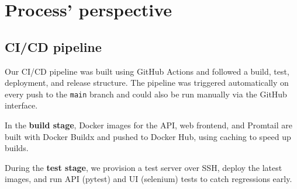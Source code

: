 \section{Process' perspective}
\begin{comment}
{

## 2. Process' perspective
This perspective should clarify how code or other artifacts come from idea into the running system and everything that happens on the way.

In particular, the following descriptions should be included:



## 2.1 A complete description of stages and tools included in the CI/CD chains, including deployment and release of your systems.

## 2.2 How do you monitor your systems and what precisely do you monitor?(alexandra :/)

## 2.3 What do you log in your systems and how do you aggregate logs? (oscar is such a stud)

## 2.4 Brief results of the security assessment and brief description of how did you harden the security of your system based on the analysis.

## 2.5 Applied strategy for scaling and upgrades.

In case you have used AI-assistants during your project briefly explain which system(s) you used during the project and reflect how it supported or hindered your process.
}
\end{comment}

\subsection{CI/CD pipeline}
Our CI/CD pipeline was built using GitHub Actions and followed a build, test, deployment, and release structure. The pipeline was triggered automatically on every push to the \texttt{main} branch and could also be run manually via the GitHub interface.

In the \textbf{build stage}, Docker images for the API, web frontend, and Promtail are built with Docker Buildx and pushed to Docker Hub, using caching to speed up builds.

During the \textbf{test stage}, we provision a test server over SSH, deploy the latest images, and run API (pytest) and UI (selenium) tests to catch regressions early.

